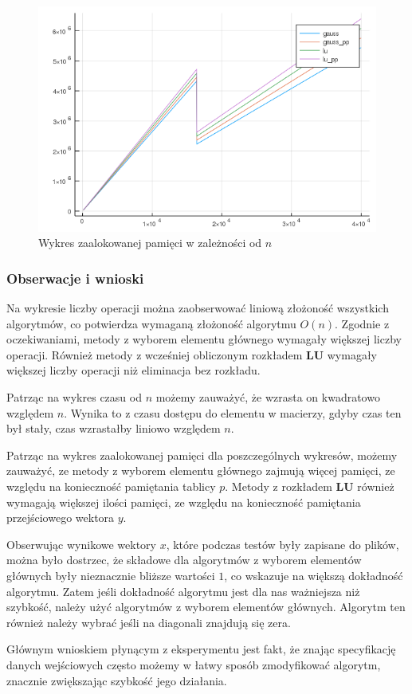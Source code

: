 \documentclass[12pt]{article}
\begin{document}
\begin{figure}[!htb]
	\centering
  		\includegraphics[width=\linewidth]{plot3_mem.png}
  		\caption{Wykres zaalokowanej pamięci w zależności od $n$}
	\endminipage
\end{figure}

\subsubsection*{Obserwacje i wnioski}
Na wykresie liczby operacji można zaobserwować liniową złożoność wszystkich algorytmów, co potwierdza wymaganą złożoność algorytmu $O(n)$. Zgodnie z oczekiwaniami, metody z wyborem elementu głównego wymagały większej liczby operacji. Również metody z wcześniej obliczonym rozkładem \textbf{LU} wymagały większej liczby operacji niż eliminacja bez rozkładu. 

Patrząc na wykres czasu od $n$ możemy zauważyć, że wzrasta on kwadratowo względem $n$. Wynika to z czasu dostępu do elementu w macierzy, gdyby czas ten był stały, czas wzrastałby liniowo względem $n$. 

Patrząc na wykres zaalokowanej pamięci dla poszczególnych wykresów, możemy zauważyć, ze metody z wyborem elementu głównego zajmują więcej pamięci, ze względu na konieczność pamiętania tablicy $p$. Metody z rozkładem \textbf{LU} również wymagają większej ilości pamięci, ze względu na konieczność pamiętania przejściowego wektora $y$.

Obserwując wynikowe wektory $x$, które podczas testów były zapisane do plików, można było dostrzec, że składowe dla algorytmów z wyborem elementów głównych były nieznacznie bliższe wartości $1$, co wskazuje na większą dokładność algorytmu. Zatem jeśli dokładność algorytmu jest dla nas ważniejsza niż szybkość, należy użyć algorytmów z wyborem elementów głównych. Algorytm ten również należy wybrać jeśli na diagonali znajdują się zera.

Głównym wnioskiem płynącym z eksperymentu jest fakt, że znając specyfikację danych wejściowych często możemy w łatwy sposób zmodyfikować algorytm, znacznie zwiększając szybkość jego działania.
\end{document}
